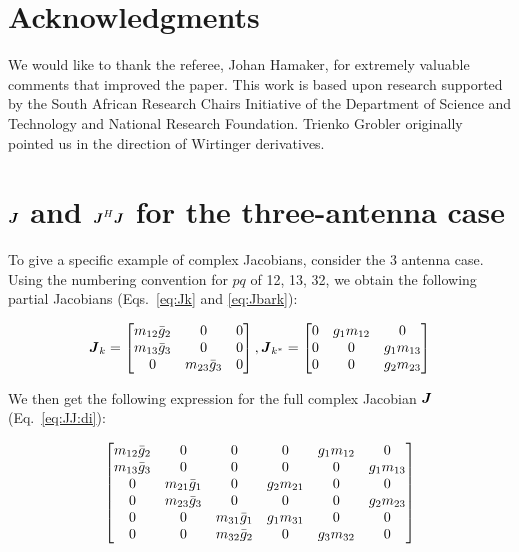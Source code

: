 \documentclass[useAMS,usenatbib]{mn2e}
\makeatletter
\newcommand{\mat}[1]{{\bmath{#1}}}
\newcommand{\JJ}{\mat{J}} %
\newcommand{\Matrix}[2]{\left [ \begin{array}{@{}#1@{}}#2\end{array} \right ]}
\numberwithin{equation}{section}
\makeatother
\begin{document}
\section*{Acknowledgments}

We would like to thank the referee, Johan Hamaker, for extremely valuable comments that improved the paper.
This work is based upon research supported by the South African Research Chairs Initiative of the Department of 
Science and Technology and National Research Foundation. Trienko Grobler originally pointed us in the direction
of Wirtinger derivatives.




\appendix

\section{$\JJ$ and $\JJ^H\JJ$ for the three-antenna case}
\label{sec:3ant}

To give a specific example of complex Jacobians, consider the 3 antenna case.
Using the numbering convention for $pq$ of 12, 13, 32, we obtain the following partial Jacobians
(Eqs.~\ref{eq:Jk} and \ref{eq:Jbark}):

\begin{equation}
\JJ_k = \Matrix{ccc}{m_{12}\bar{g}_2 & 0 & 0 \\ m_{13}\bar{g}_3 & 0 & 0 \\ 0 & m_{23}\bar{g}_3 & 0 },
\JJ_{k^*} = \Matrix{ccc}{0 & g_1 m_{12} & 0 \\ 0 & 0 & g_1 m_{13} \\ 0 & 0 & g_2 m_{23} }
\end{equation}

We then get the following expression
for the full complex Jacobian $\JJ$ (Eq.~\ref{eq:JJ:di}):

\begin{equation}
\label{eq:JJ:3ant}
\Matrix{cccccc}{
  m_{12}\bar{g}_2 & 0               & 0 &  0          & g_1 m_{12} & 0           \\
  m_{13}\bar{g}_3 & 0               & 0 &  0          & 0          & g_1 m_{13}  \\
  0               & m_{21}\bar{g}_1 & 0 &  g_2 m_{21} & 0          & 0  \\
  0               & m_{23}\bar{g}_3 & 0 &  0          & 0          & g_2 m_{23} \\
  0               & 0               & m_{31}\bar{g}_1 & g_1 m_{31} & 0          & 0  \\
  0               & 0               & m_{32}\bar{g}_2 & 0 & g_3 m_{32} & 0 \\
}
\end{equation}
\end{document}
